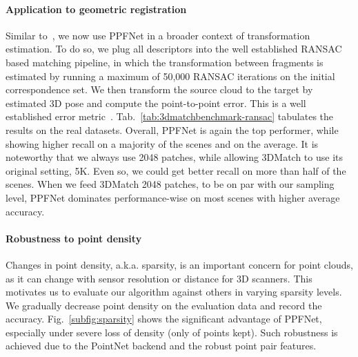\documentclass[10pt,twocolumn,letterpaper]{article}
\theoremstyle{break}
\begin{document}
\paragraph{Application to geometric registration}
Similar to~\cite{zeng20163dmatch}, we now use PPFNet in a broader context of transformation estimation. To do so, we plug all descriptors into the well established RANSAC based matching pipeline, in which the transformation between fragments is estimated by running a maximum of 50,000 RANSAC iterations on the initial correspondence set. We then transform the source cloud to the target by estimated 3D pose and compute the point-to-point error. This is a well established error metric~\cite{zeng20163dmatch}. Tab.~\ref{tab:3dmatchbenchmark-ransac} tabulates the results on the real datasets. Overall, PPFNet is again the top performer, while showing higher recall on a majority of the scenes and on the average. It is noteworthy that we always use 2048 patches, while allowing 3DMatch to use its original setting, 5K. Even so, we could get better recall on more than half of the scenes. When we feed 3DMatch 2048 patches, to be on par with our sampling level, PPFNet dominates performance-wise on most scenes with higher average accuracy. 
\vspace{-3mm}
\paragraph{Robustness to point density}
Changes in point density, a.k.a. sparsity, is an important concern for point clouds, as it can change with sensor resolution or distance for 3D scanners. This motivates us to evaluate our algorithm against others in varying sparsity levels. We gradually decrease point density on the evaluation data and record the accuracy. Fig.~\ref{subfig:sparsity} shows the significant advantage of PPFNet, especially under severe loss of density (only  of points kept). Such robustness is achieved due to the PointNet backend and the robust point pair features. 
\begin{table}[t!]
  \centering
  \caption{Average per-patch runtime of different methods.}
  \vspace{-3mm}
\end{table}\vspace{-3mm}
\end{document}
